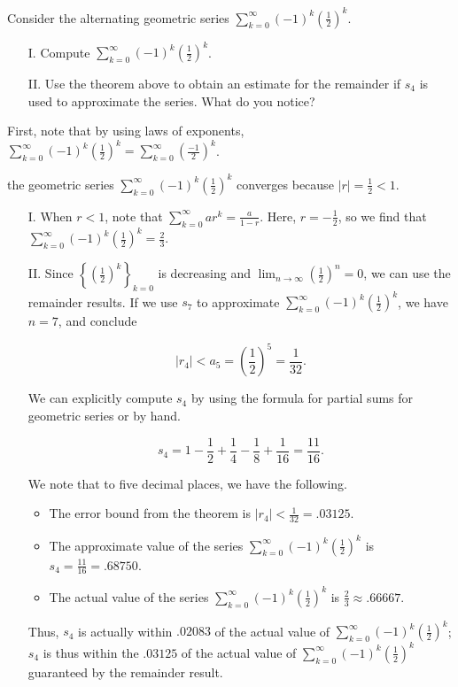\documentclass{ximera}
\begin{document}
\begin{example}
Consider the alternating geometric series $\sum_{k=0}^{\infty} (-1)^k \left(\frac{1}{2}\right)^k$.

\begin{itemize}
\item[I.] Compute $\sum_{k=0}^{\infty} (-1)^k \left(\frac{1}{2}\right)^k$.
\item[II.] Use the theorem above to obtain an estimate for the remainder if $s_4$ is used to approximate the series.  What do you notice?
\end{itemize}

\begin{explanation}
First, note that by using laws of exponents, $\sum_{k=0}^{\infty} (-1)^k \left(\frac{1}{2}\right)^k = \sum_{k=0}^{\infty}  \left(\frac{-1}{2}\right)^k$.   

the geometric series $\sum_{k=0}^{\infty} (-1)^k \left(\frac{1}{2}\right)^k$ converges because $|r| = \frac{1}{2} <1$.

\begin{itemize}
\item[I.] When $r<1$, note that $\sum_{k=0}^{\infty} ar^k = \frac{a}{1-r}$.  Here, $r= -\frac{1}{2}$, so we find that $\sum_{k=0}^{\infty} (-1)^k \left(\frac{1}{2}\right)^k= \frac{2}{3}.$
\item[II.] Since $\left\{\left(\frac{1}{2}\right)^k\right\}_{k=0}$ is decreasing and $\lim_{n \to \infty} \left(\frac{1}{2}\right)^n =0$, we can use the remainder results.  If we use $s_7$ to approximate  $\sum_{k=0}^{\infty} (-1)^k \left(\frac{1}{2}\right)^k$, we have $n=7$, and conclude

\[
|r_4| < a_5 = \left(\frac{1}{2}\right)^5 = \frac{1}{32}.
\]

We can explicitly compute $s_4$ by using the formula for partial sums for geometric series or by hand.

\[
s_4 = 1-\frac{1}{2}+\frac{1}{4}-\frac{1}{8}+\frac{1}{16} = \frac{11}{16}.
\]

We note that to five decimal places, we have the following.

\begin{itemize}
\item The error bound from the theorem is $|r_4| < \frac{1}{32} = .03125$.
\item The approximate value of the series $\sum_{k=0}^{\infty} (-1)^k \left(\frac{1}{2}\right)^k$ is $s_4 = \frac{11}{16} = .68750$.
\item The actual value of the series $\sum_{k=0}^{\infty} (-1)^k \left(\frac{1}{2}\right)^k$ is $\frac{2}{3} \approx .66667$.
\end{itemize}

Thus, $s_4$ is actually within $.02083$ of the actual value of $\sum_{k=0}^{\infty} (-1)^k \left(\frac{1}{2}\right)^k$; $s_4$ is thus within the $.03125$ of the actual value of $\sum_{k=0}^{\infty} (-1)^k \left(\frac{1}{2}\right)^k$ guaranteed by the remainder result.

\end{itemize}
\end{explanation}
\end{example}
\end{document}

